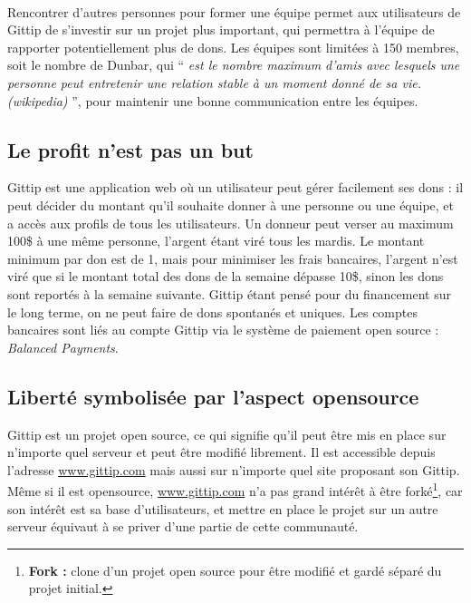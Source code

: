 \paragraph{}
Rencontrer d'autres personnes pour former une équipe permet aux utilisateurs de
Gittip de s'investir sur un projet plus important, qui permettra à l'équipe de
rapporter potentiellement plus de dons. Les équipes sont limitées à 150
membres, soit le nombre de Dunbar, qui `` \emph{est le nombre maximum
d'amis avec lesquels une personne peut entretenir une relation stable à un
moment donné de sa vie. (wikipedia)} '', pour maintenir une bonne communication
entre les équipes.

    \subsection{Le profit n'est pas un but}

Gittip est une application web où un utilisateur peut gérer facilement ses dons
: il peut décider du montant qu'il souhaite donner à une personne ou une
équipe, et a accès aux profils de tous les utilisateurs. Un donneur peut verser
au maximum 100\${} à une même personne, l'argent étant viré tous les mardis. Le
montant minimum par don est de 1\textcent, mais pour minimiser les frais
bancaires, l'argent n'est viré que si le montant total des dons de la semaine
dépasse 10\${}, sinon les dons sont reportés à la semaine suivante.  Gittip
étant pensé pour du financement sur le long terme, on ne peut faire de dons
spontanés et uniques. Les comptes bancaires sont liés au compte Gittip via le
système de paiement open source : \emph{Balanced Payments}.

    \subsection{Liberté symbolisée par l'aspect opensource}

Gittip est un projet open source, ce qui signifie qu'il peut être mis en place
sur n'importe quel serveur et peut être modifié librement.  Il est accessible
depuis l'adresse \url{www.gittip.com} mais aussi sur n'importe quel site
proposant son Gittip. Même si il est opensource, \url{www.gittip.com} n'a pas
grand intérêt à être forké\footnote{\textbf{Fork :} clone d'un projet open
source pour être modifié et gardé séparé du projet initial.}, car son intérêt
est sa base d'utilisateurs, et mettre en place le projet sur un autre serveur
équivaut à se priver d'une partie de cette communauté.

